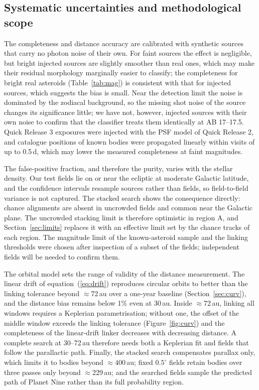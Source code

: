 \documentclass[twocolumn,linenumbers]{aastex702}
\begin{document}
\subsection{Systematic uncertainties and methodological scope}\label{sec:scope}
The completeness and distance accuracy are calibrated with synthetic sources that carry no photon noise of their own. For faint sources the effect is negligible, but bright injected sources are slightly smoother than real ones, which may make their residual morphology marginally easier to classify; the completeness for bright real asteroids (Table~\ref{tab:mag}) is consistent with that for injected sources, which suggests the bias is small. Near the detection limit the noise is dominated by the zodiacal background, so the missing shot noise of the source changes its significance little; we have not, however, injected sources with their own noise to confirm that the classifier treats them identically at AB 17--17.5. Quick Release 3 exposures were injected with the PSF model of Quick Release 2, and catalogue positions of known bodies were propagated linearly within visits of up to 0.5\,d, which may lower the measured completeness at faint magnitudes.

The false-positive fraction, and therefore the purity, varies with the stellar density. Our test fields lie on or near the ecliptic at moderate Galactic latitude, and the confidence intervals resample sources rather than fields, so field-to-field variance is not captured. The stacked search shows the consequence directly: chance alignments are absent in uncrowded fields and common near the Galactic plane. The uncrowded stacking limit is therefore optimistic in region A, and Section~\ref{sec:limits} replaces it with an effective limit set by the chance tracks of each region. The magnitude limit of the known-asteroid sample and the linking thresholds were chosen after inspection of a subset of the fields; independent fields will be needed to confirm them.

The orbital model sets the range of validity of the distance measurement. The linear drift of equation~(\ref{eq:drift}) reproduces circular orbits to better than the linking tolerance beyond $\approx$72\,au over a one-year baseline (Section~\ref{sec:curv}), and the distance bias remains below 1\% even at 30\,au. Inside $\approx$72\,au, linking all windows requires a Keplerian parametrisation; without one, the offset of the middle window exceeds the linking tolerance (Figure~\ref{fig:curv}) and the completeness of the linear-drift linker decreases with decreasing distance. A complete search at 30--72\,au therefore needs both a Keplerian fit and fields that follow the parallactic path. Finally, the stacked search compensates parallax only, which limits it to bodies beyond $\approx 400$\,au; fixed $0.5^\circ$ fields retain bodies over three passes only beyond $\approx$229\,au; and the searched fields sample the predicted path of Planet Nine rather than its full probability region.
\end{document}
